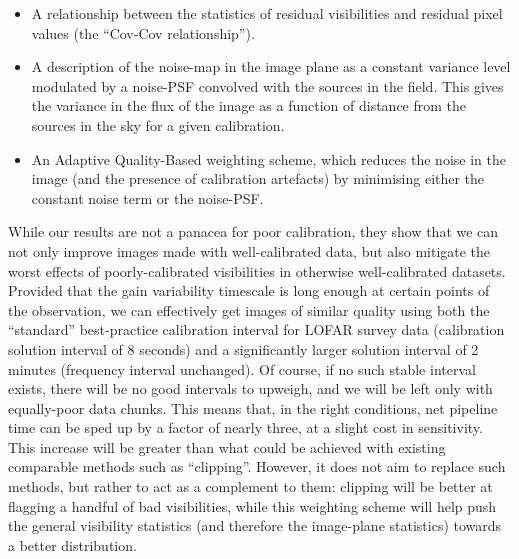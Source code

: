\begin{itemize}
\item A relationship between the statistics of residual visibilities and residual pixel values (the ``Cov-Cov relationship'').
\item A description of the noise-map in the image plane {as a constant variance level modulated by a noise-PSF convolved with the sources in the field. This gives }the variance in the flux of the image as a function of distance from the sources in the sky for a given calibration.
\item {An Adaptive Quality-Based weighting scheme, which reduces the noise in the image (and the presence of calibration artefacts) by minimising either the constant noise term or the noise-PSF.} 
\end{itemize}

\pg
{While our results are not a panacea for poor calibration, they show that we can not only improve images made with well-calibrated data, but also mitigate the worst effects of poorly-calibrated visibilities in otherwise well-calibrated datasets. Provided that the gain variability timescale is long enough at certain points of the observation, we can effectively get images of similar quality using both the} ``standard'' best-practice calibration interval for LOFAR survey data (calibration solution interval of 8 seconds) and a significantly larger solution interval of 2 minutes (frequency interval unchanged). {Of course, if no such stable interval exists, there will be no good intervals to upweigh, and we will be left only with equally-poor data chunks.} This means that{, in the right conditions,} net pipeline time {can be} sped up by a factor of nearly three, at a slight cost in sensitivity. {This increase will be greater than what could be achieved with existing comparable methods such as ``clipping''.} However, it does not aim to replace such methods, but rather to act as a complement to them: clipping will be better at flagging a handful of bad visibilities, while this weighting scheme will help push the general visibility statistics (and therefore the image-plane statistics) towards a better distribution.

